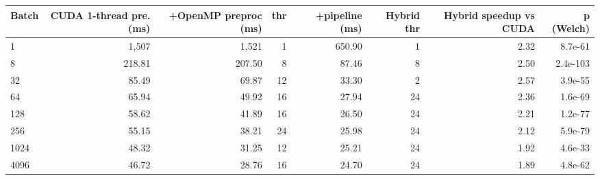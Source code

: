 \begin{tabular}{lrrrrrrr}
\toprule
Batch & CUDA 1-thread pre. (ms) & +OpenMP preproc (ms) & thr & +pipeline (ms) & Hybrid thr & Hybrid speedup vs CUDA & p (Welch) \\
\midrule
1 & 1,507 & 1,521 & 1 & 650.90 & 1 & 2.32 & 8.7e-61 \\
8 & 218.81 & 207.50 & 8 & 87.46 & 8 & 2.50 & 2.4e-103 \\
32 & 85.49 & 69.87 & 12 & 33.30 & 2 & 2.57 & 3.9e-55 \\
64 & 65.94 & 49.92 & 16 & 27.94 & 24 & 2.36 & 1.6e-69 \\
128 & 58.62 & 41.89 & 16 & 26.50 & 24 & 2.21 & 1.2e-77 \\
256 & 55.15 & 38.21 & 24 & 25.98 & 24 & 2.12 & 5.9e-79 \\
1024 & 48.32 & 31.25 & 12 & 25.21 & 24 & 1.92 & 4.6e-33 \\
4096 & 46.72 & 28.76 & 16 & 24.70 & 24 & 1.89 & 4.8e-62 \\
\bottomrule
\end{tabular}

